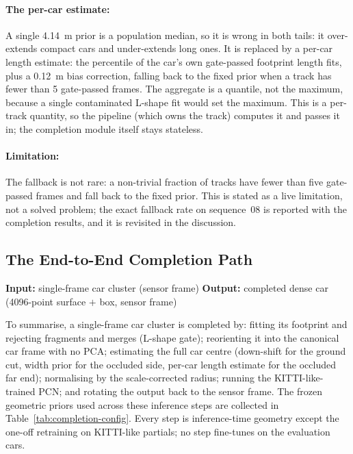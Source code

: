 \paragraph{The per-car estimate:} A single \SI{4.14}{\meter}
prior is a population median, so it is wrong in both tails: it over-extends
compact cars and under-extends long ones. It is replaced by a per-car length estimate:
the  percentile of the car's own
gate-passed footprint length fits, plus a \SI{0.12}{\meter} bias correction,
falling back to the fixed prior when a track has fewer than \num{5} gate-passed
frames. The aggregate is a quantile, not the maximum, because a single
contaminated L-shape fit would set the maximum. This is a per-track quantity, so the
pipeline (which owns the track) computes it and passes it in; the completion module itself
stays stateless.

\paragraph{Limitation:} The fallback is not rare: a non-trivial fraction of tracks have
fewer than five gate-passed frames and fall back to the fixed prior. This is stated as a
live limitation, not a solved problem; the exact fallback rate on sequence~08 is reported
with the completion results, and it is revisited in the discussion.

\subsection{The End-to-End Completion Path}
\label{sec:completion-summary}

\noindent \textbf{Input:} single-frame car cluster (sensor frame) \quad \textbar \quad \textbf{Output:} completed dense car (\num{4096}-point surface $+$ box, sensor frame) \vspace{0.5em}

To summarise, a single-frame car cluster is completed by: fitting its footprint
and rejecting fragments and merges (L-shape gate); reorienting it into the
canonical car frame with no PCA; estimating the full car centre (down-shift for
the ground cut, width prior for the occluded side, per-car length estimate for
the occluded far end); normalising by the scale-corrected radius; running the
KITTI-like-trained PCN; and rotating the output back to the sensor frame. The frozen
geometric priors used across these inference steps are collected in
Table~\ref{tab:completion-config}. Every
step is inference-time geometry except the one-off retraining on KITTI-like
partials; no step fine-tunes on the evaluation cars.

